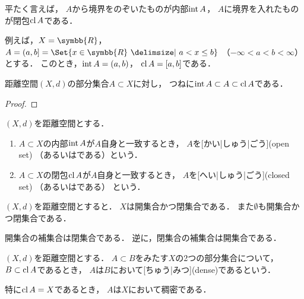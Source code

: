 \documentclass[../sotsu.tex]{subfiles}
\begin{document}
平たく言えば，
$A$から境界をのぞいたものが内部$\operatorname{int}{A}$，
$A$に境界を入れたものが閉包$\operatorname{cl}{A}$である．

例えば，$X = \symbb{R}$，
$A = (a, b] = \Set{ x \in \symbb{R} \given a < x \leq b }$
（$-\infty < a < b < \infty$）とする．
このとき，$\operatorname{int}{A} = (a, b)$，
$\operatorname{cl}{A} = [a, b]$である．

\begin{proposition}
    距離空間$(X, d)$の部分集合$A \subset X$に対し，
    つねに$\operatorname{int}{A} \subset A \subset \operatorname{cl}{A}$である．
\end{proposition}

\begin{proof}
    
\end{proof}


\begin{definition}[開集合と閉集合]
    \label{dfn:open-set-and-closed-set}
    \label{dfn:open-set}
    \label{dfn:closed-set}
    $(X, d)$を距離空間とする．
    \begin{enumerate}
        \item 
            $A \subset X$の内部$\operatorname{int}{A}$が$A$自身と一致するとき，
            $A$を[かい|しゅう|ごう](open set)
            （あるいはである）という．
        \item 
            $A \subset X$の閉包$\operatorname{cl}{A}$が$A$自身と一致するとき，
            $A$を[へい|しゅう|ごう](closed set)
            （あるいはである） という．
    \end{enumerate}
\end{definition}

$(X, d)$を距離空間とすると．
$X$は開集合かつ閉集合である．
また$\emptyset$も開集合かつ閉集合である．

\begin{proposition}
    開集合の補集合は閉集合である．
    逆に，閉集合の補集合は開集合である．
\end{proposition}





\begin{definition}[稠密]
    \label{dfn:dense}
    $(X, d)$を距離空間とする．
    $A \subset B$をみたす$X$の2つの部分集合について，
    $B \subset \operatorname{cl}{A}$であるとき，
    $A$は$B$において[ちゅう|みつ](dense)であるという\cite{iwanami-functional}．

    特に$\operatorname{cl}{A} = X$であるとき，
    $A$は$X$において稠密である．
\end{definition}
\end{document}
